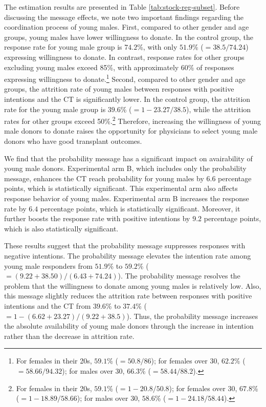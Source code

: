 \documentclass[12pt, a4paper]{article}
\begin{document}
The estimation results are presented in Table \ref{tab:stock-reg-subset}. Before discussing the message effects, we note two important findings regarding the coordination process of young males. First, compared to other gender and age groups, young males have lower willingness to donate. In the control group, the response rate for young male group is \(74.2\)\%, with only \(51.9\)\% (\(=38.5/74.24\)) expressing willingness to donate. In contrast, response rates for other groups excluding young males exceed 85\%, with approximately 60\% of responses expressing willingness to donate.\footnote{For females in their 20s, \(59.1\)\% (\(=50.8/86\)); for females over 30, \(62.2\)\% (\(=58.66/94.32\)); for males over 30, \(66.3\)\% (\(=58.44/88.2\)).} Second, compared to other gender and age groups, the attrition rate of young males between responses with positive intentions and the CT is significantly lower. In the control group, the attrition rate for the young male group is \(39.6\)\% (\(=1-23.27/38.5\)), while the attrition rates for other groups exceed 50\%.\footnote{For females in their 20s, \(59.1\)\% (\(=1 - 20.8/50.8\)); for females over 30, \(67.8\)\% (\(=1-18.89/58.66\)); for males over 30, \(58.6\)\% (\(=1-24.18/58.44\)).} Therefore, increasing the willingness of young male donors to donate raises the opportunity for physicians to select young male donors who have good transplant outcomes.

We find that the probability message has a significant impact on avairability of young male donors. Experimental arm B, which includes only the probability message, enhances the CT reach probability for young males by \(6.6\) percentage points, which is statistically significant. This experimental arm also affects response behavior of young males. Experimental arm B increases the response rate by \(6.4\) percentage points, which is statistically significant. Moreover, it further boosts the response rate with positive intentions by \(9.2\) percentage points, which is also statistically significant.

These results suggest that the probability message suppresses responses with negative intentions. The probability message elevates the intention rate among young male responders from \(51.9\)\% to \(59.2\)\% (\(=(9.22+38.50)/(6.43+74.24)\)). The probability message resolves the problem that the willingness to donate among young males is relatively low. Also, this message slightly reduces the attrition rate between responses with positive intentions and the CT from \(39.6\)\% to \(37.4\)\% (\(=1-(6.62+23.27)/(9.22+38.5)\)). Thus, the probability message increases the absolute availability of young male donors through the increase in intention rather than the decrease in attrition rate.
\end{document}
